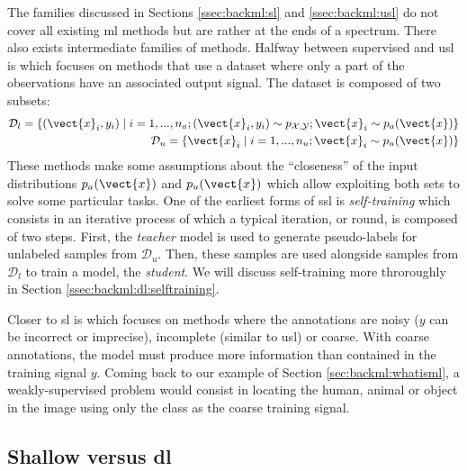 The families discussed in Sections \ref{ssec:backml:sl} and \ref{ssec:backml:usl}
do not cover all existing \acrlong{ml} methods but are rather at the ends of a
spectrum. There also exists intermediate families of methods. Halfway between
supervised and \acrlong{usl} is  which focuses on methods that
use a dataset where only a part of the observations have an associated output
signal. The dataset is composed of two subsets:
\begin{eqnarray}
\mathcal{D}_l = \left\{(\vect{x}_i, y_i) \mid i = 1,...,n_a; (\vect{x}_i, y_i) \sim p_{\mathcal{X},\mathcal{Y}}; \vect{x}_i \sim p_a(\vect{x})\right\} \\
\mathcal{D}_u = \left\{\vect{x}_i \mid i = 1,...,n_u; \vect{x}_i \sim p_u(\vect{x})\right\}
\end{eqnarray}
These methods make some assumptions about the ``closeness'' of the input distributions
$p_a(\vect{x})$ and $p_u(\vect{x})$ \parencite{chapelle2006semi} which allow
exploiting both sets to solve some particular tasks. One of the earliest forms of
\acrlong{ssl} is \textit{self-training} \parencite{scudder1965probability, yarowsky1995unsupervised} which consists in an iterative process of which a typical iteration, or round, is composed of two steps. First, the \textit{teacher} model is used to generate pseudo-labels for unlabeled samples from $\mathcal{D}_u$. Then, these samples are used alongside samples from $\mathcal{D}_l$ to train a model, the \textit{student}. We will discuss self-training more throroughly in Section \ref{ssec:backml:dl:selftraining}.

Closer to \acrlong{sl} is  which focuses on methods where the
annotations are noisy (\eg $y$ can be incorrect or imprecise), incomplete (similar
to \acrlong{usl}) or coarse. With coarse annotations, the model must produce more
information than contained in the training signal $y$. Coming back to our example
of Section \ref{sec:backml:whatisml}, a weakly-supervised problem would consist
in locating the human, animal or object in the image using only the class as the
coarse training signal.

\subsection{Shallow versus \acrlong{dl}}
\label{ssec:backml:shallowdeep}

